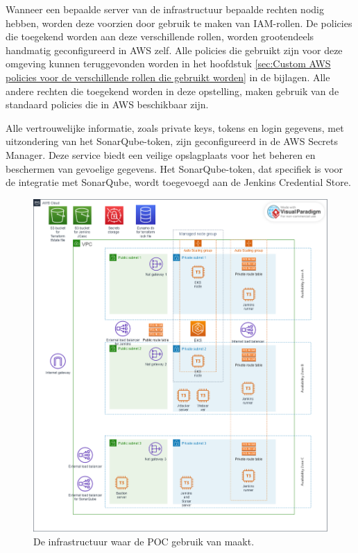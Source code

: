 Wanneer een bepaalde server van de infrastructuur bepaalde rechten nodig hebben, worden deze voorzien door gebruik te maken van IAM-rollen. De policies die toegekend worden aan deze verschillende rollen, worden grootendeels handmatig geconfigureerd in AWS zelf. Alle policies die gebruikt zijn voor deze omgeving kunnen teruggevonden worden in het hoofdstuk \ref{sec:Custom AWS policies voor de verschillende rollen die gebruikt worden} in de bijlagen. Alle andere rechten die toegekend worden in deze opstelling, maken gebruik van de standaard policies die in AWS beschikbaar zijn.
\newline

Alle vertrouwelijke informatie, zoals private keys, tokens en login gegevens, met uitzondering van het SonarQube-token, zijn geconfigureerd in de AWS Secrets Manager. Deze service biedt een veilige opslagplaats voor het beheren en beschermen van gevoelige gegevens. Het SonarQube-token, dat specifiek is voor de integratie met SonarQube, wordt toegevoegd aan de Jenkins Credential Store.

\begin{figure}[H]
  \includegraphics[scale=0.40]{graphics/infrastructuur.png}
\caption{\label{fig:aws_infrastructuur} De infrastructuur waar de POC gebruik van maakt.}
\end{figure}
\clearpage

